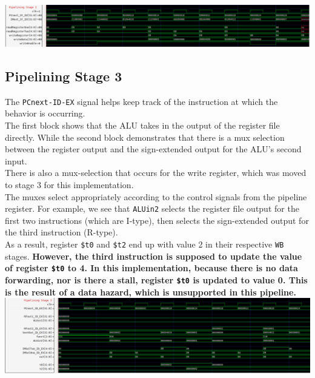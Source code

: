 \documentclass[twocolumn]{article}
\newcommand{\cc}[1]{\texttt{#1}}
\begin{document}
\begingroup
    \centering
    \medskip
    \includegraphics[width=\columnwidth]{Lab-Tex/Lab6-images/p3.png}
    \medskip
\endgroup

\subsection{Pipelining Stage 3}

The \cc{PCnext-ID-EX} signal helps keep track of the instruction at which the behavior is occurring. \\

The first block shows that the ALU takes in the output of the register file directly. While the second block demonstrates that there is a mux selection between the register output and the sign-extended output for the ALU's second input. \\

There is also a mux-selection that occurs for the write register, which was moved to stage 3 for this implementation. \\

The muxes select appropriately according to the control signals from the pipeline register. For example, we see that \cc{ALUin2} selects the register file output for the first two instructions (which are I-type), then selects the sign-extended output for the third instruction (R-type). \\

As a result, register \cc{\$t0} and \cc{\$t2} end up with value 2 in their respective \cc{WB} stages. \textbf{However, the third instruction is supposed to update the value of register \cc{\$t0} to 4. In this implementation, because there is no data forwarding, nor is there a stall, register \cc{\$t0} is updated to value 0. This is the result of a data hazard, which is unsupported in this pipeline.}\\

\begingroup
    \centering
    \medskip
    \includegraphics[width=\columnwidth]{Lab-Tex/Lab6-images/p4.png}
    \medskip
\endgroup
\end{document}
